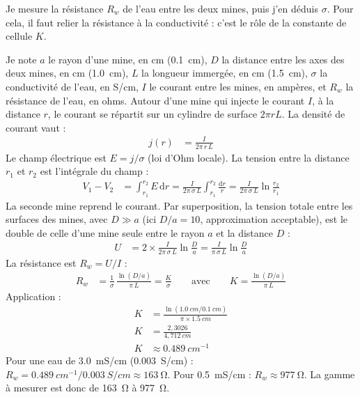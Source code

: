 Je mesure la résistance $R_w$ de l'eau entre les deux mines, puis j'en déduis $\sigma$. Pour cela, il faut relier la résistance à la conductivité : c'est le rôle de la constante de cellule $K$.

\begin{demonstration}
Je note $a$ le rayon d'une mine, en cm (\qty{0,1}{cm}), $D$ la distance entre les axes des deux mines, en cm (\qty{1,0}{cm}), $L$ la longueur immergée, en cm (\qty{1,5}{cm}), $\sigma$ la conductivité de l'eau, en S/cm, $I$ le courant entre les mines, en ampères, et $R_w$ la résistance de l'eau, en ohms. Autour d'une mine qui injecte le courant $I$, à la distance $r$, le courant se répartit sur un cylindre de surface $2\pi r L$. La densité de courant vaut :
\begin{align*}
j(r) &= \frac{I}{2\pi\,r\,L}
\end{align*}
Le champ électrique est $E = j/\sigma$ (loi d'Ohm locale). La tension entre la distance $r_1$ et $r_2$ est l'intégrale du champ :
\begin{align*}
V_1 - V_2 &= \int_{r_1}^{r_2} E\,\mathrm{d}r = \frac{I}{2\pi\,\sigma\,L}\int_{r_1}^{r_2}\frac{\mathrm{d}r}{r} = \frac{I}{2\pi\,\sigma\,L}\ln\frac{r_2}{r_1}
\end{align*}
La seconde mine reprend le courant. Par superposition, la tension totale entre les surfaces des mines, avec $D \gg a$ (ici $D/a = 10$, approximation acceptable), est le double de celle d'une mine seule entre le rayon $a$ et la distance $D$ :
\begin{align*}
U &= 2 \times \frac{I}{2\pi\,\sigma\,L}\ln\frac{D}{a} = \frac{I}{\pi\,\sigma\,L}\ln\frac{D}{a}
\end{align*}
La résistance est $R_w = U/I$ :
\begin{align*}
R_w &= \frac{1}{\sigma}\,\frac{\ln(D/a)}{\pi\,L} = \frac{K}{\sigma}\qquad\text{avec}\qquad K = \frac{\ln(D/a)}{\pi\,L}
\end{align*}
Application :
\begin{align*}
K &= \frac{\ln(\qty{1,0}{cm}/\qty{0,1}{cm})}{\pi \times \qty{1,5}{cm}}\\
K &= \frac{2{,}3026}{4{,}712\ \unit{cm}}\\
K &\approx \qty{0,489}{cm^{-1}}
\end{align*}
Pour une eau de \qty{3,0}{mS/cm} (\qty{0,003}{S/cm}) : $R_w = \qty{0,489}{cm^{-1}}/\qty{0,003}{S/cm} \approx \qty{163}{\ohm}$. Pour \qty{0,5}{mS/cm} : $R_w \approx \qty{977}{\ohm}$. La gamme à mesurer est donc de \qty{163}{\ohm} à \qty{977}{\ohm}.
\end{demonstration}

